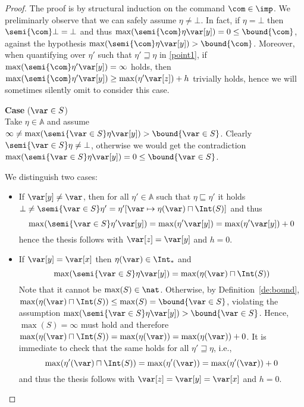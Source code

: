 \begin{proof}
  The proof is by structural induction on the command \(\com\in \imp\).
  We preliminarly observe that we can safely assume
  \(\eta \neq \bot\).
  In fact, if \(\eta = \bot\) then \(\semi{\com} \bot = \bot\) and
  thus \(\max(\semi{\com} \eta \var[y]) = 0 \leq \bound{\com}\),
  against the hypothesis
  \(\max(\semi{\com}\eta \var[y]) > \bound{\com}\). Moreover, when
  quantifying over \(\eta'\) such that \(\eta' \sqsupseteq \eta\) in
  \ref{point1}, if \(\max(\semi{\com}\eta' \var[y]) = \infty\)
  holds, then
  \(\max(\semi{\com}\eta' \var[y]) \geq \max(\eta' \var[z]) + h\)
  trivially holds, hence we will sometimes silently omit to consider
  this case.
  
  \medskip
  
  \noindent
  \textbf{Case} (\(\var \in S\))\\
  Take \(\eta \in \mathbb{A}\) and assume
  \(\infty\neq\max(\semi{\var \in S}\eta \var[y]) > \bound{\var \in S}\).
  Clearly \(\semi{\var \in S}\eta \neq \bot\), otherwise we would get the contradiction
  \(\max(\semi{\var \in S}\eta \var[y]) =0 \leq \bound{\var \in S}\).
  
  We distinguish two cases:
  \begin{itemize}
    
  \item If \(\var[y] \neq \var\), then for all \(\eta' \in \mathbb{A}\)
    such that \(\eta \sqsubseteq \eta'\) it holds
    \(\bot \neq \semi{\var \in S}\eta' = \eta'[\var \mapsto \eta(\var)
      \sqcap \Int(S)]\) and thus
    \[
    \max(\semi{\var \in S}\eta' \var[y]) = \max(\eta' \var[y]) = \max(\eta' \var[y]) + 0
    \]
    hence the thesis follows with \(\var[z]=\var[y]\) and \(h = 0\).

  \item If \(\var[y] = \var[x]\) then  \(\eta(\var) \in \Int_*\) and
    \[ 
    \max(\semi{\var \in S}\eta \var[y]) = \max (\eta(\var) \sqcap
    \Int(S))
    \]
    Note that it cannot be \(\max(S)\in \nat\). Otherwise, by
    Definition~\ref{de:bound},
    \(\max (\eta(\var) \sqcap \Int(S)) \leq \max(S)= \bound{\var \in
      S}\), violating the assumption \(\max(\semi{\var \in S}\eta \var[y]) > \bound{\var \in S}\).
    Hence, \(\max(S) = \infty\) must hold and therefore
    \(\max (\eta(\var) \sqcap \Int(S)) = \max(\eta(\var))=
    \max(\eta(\var))+0\). It is immediate to check that the same holds
    for all
    \(\eta' \sqsupseteq \eta\), i.e.,
    \[
    \max (\eta'(\var) \sqcap \Int(S)) = \max(\eta'(\var))=
    \max(\eta'(\var))+0
    \]
    and thus the thesis follows with  \(\var[z]=\var[y]=\var[x]\) and \(h=0\).
  \end{itemize}  
  

\end{proof}
